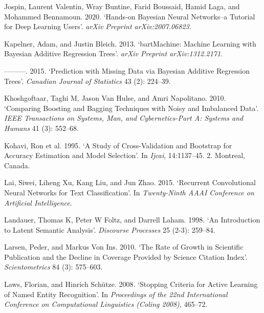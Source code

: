 \documentclass{article}
\newlength{\cslhangindent}
\newlength{\cslentryspacingunit} %
\newenvironment{CSLReferences}[2] %
 {%
  \setlength{\parindent}{0pt}
  \ifodd #1
  \let\oldpar\par
  \def\par{\hangindent=\cslhangindent\oldpar}
  \fi
  \setlength{\parskip}{#2\cslentryspacingunit}
 }%
 {}
\begin{document}
\begin{CSLReferences}{1}{0}
\leavevmode{}%
Jospin, Laurent Valentin, Wray Buntine, Farid Boussaid, Hamid Laga, and
Mohammed Bennamoun. 2020. {`Hands-on Bayesian Neural Networks--a
Tutorial for Deep Learning Users'}. \emph{arXiv Preprint
arXiv:2007.06823}.

\leavevmode{}%
Kapelner, Adam, and Justin Bleich. 2013. {`bartMachine: Machine Learning
with Bayesian Additive Regression Trees'}. \emph{arXiv Preprint
arXiv:1312.2171}.

\leavevmode{}%
---------. 2015. {`Prediction with Missing Data via Bayesian Additive
Regression Trees'}. \emph{Canadian Journal of Statistics} 43 (2):
224--39.

\leavevmode{}%
Khoshgoftaar, Taghi M, Jason Van Hulse, and Amri Napolitano. 2010.
{`Comparing Boosting and Bagging Techniques with Noisy and Imbalanced
Data'}. \emph{IEEE Transactions on Systems, Man, and Cybernetics-Part A:
Systems and Humans} 41 (3): 552--68.

\leavevmode{}%
Kohavi, Ron et al. 1995. {`A Study of Cross-Validation and Bootstrap for
Accuracy Estimation and Model Selection'}. In \emph{Ijcai}, 14:1137--45.
2. Montreal, Canada.

\leavevmode{}%
Lai, Siwei, Liheng Xu, Kang Liu, and Jun Zhao. 2015. {`Recurrent
Convolutional Neural Networks for Text Classification'}. In
\emph{Twenty-Ninth AAAI Conference on Artificial Intelligence}.

\leavevmode{}%
Landauer, Thomas K, Peter W Foltz, and Darrell Laham. 1998. {`An
Introduction to Latent Semantic Analysis'}. \emph{Discourse Processes}
25 (2-3): 259--84.

\leavevmode{}%
Larsen, Peder, and Markus Von Ins. 2010. {`The Rate of Growth in
Scientific Publication and the Decline in Coverage Provided by Science
Citation Index'}. \emph{Scientometrics} 84 (3): 575--603.

\leavevmode{}%
Laws, Florian, and Hinrich Schütze. 2008. {`Stopping Criteria for Active
Learning of Named Entity Recognition'}. In \emph{Proceedings of the 22nd
International Conference on Computational Linguistics (Coling 2008)},
465--72.


\end{CSLReferences}
\end{document}
